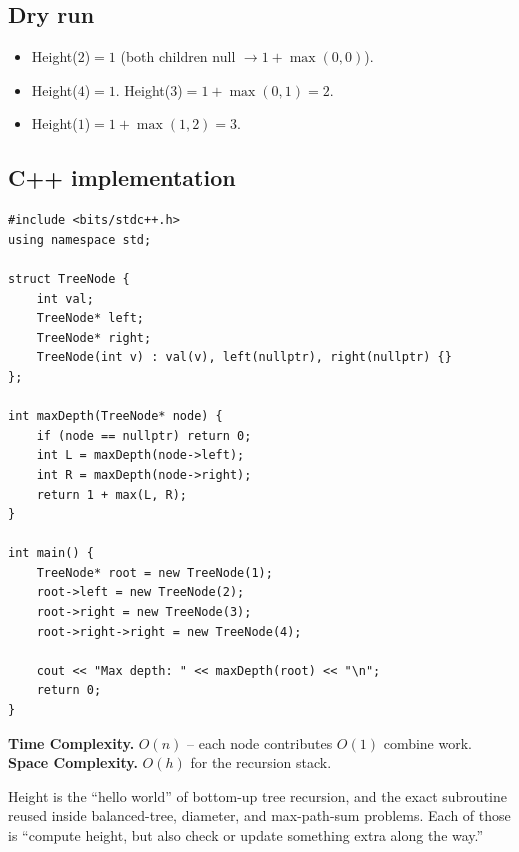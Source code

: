 \subsection*{Dry run}


\begin{itemize}
  \item Height($2$)$=1$ (both children null $\to 1+\max(0,0)$).
  \item Height($4$)$=1$. Height($3$)$=1+\max(0,1)=2$.
  \item Height($1$)$=1+\max(1,2)=3$.
\end{itemize}

\subsection*{C++ implementation}

\begin{lstlisting}
#include <bits/stdc++.h>
using namespace std;

struct TreeNode {
    int val;
    TreeNode* left;
    TreeNode* right;
    TreeNode(int v) : val(v), left(nullptr), right(nullptr) {}
};

int maxDepth(TreeNode* node) {
    if (node == nullptr) return 0;
    int L = maxDepth(node->left);
    int R = maxDepth(node->right);
    return 1 + max(L, R);
}

int main() {
    TreeNode* root = new TreeNode(1);
    root->left = new TreeNode(2);
    root->right = new TreeNode(3);
    root->right->right = new TreeNode(4);

    cout << "Max depth: " << maxDepth(root) << "\n";
    return 0;
}
\end{lstlisting}

\begin{complexitybox}
\textbf{Time Complexity.} $O(n)$ -- each node contributes $O(1)$ combine
work. \textbf{Space Complexity.} $O(h)$ for the recursion stack.
\end{complexitybox}

\begin{takeawaybox}
Height is the ``hello world'' of bottom-up tree recursion, and the exact
subroutine reused inside balanced-tree, diameter, and max-path-sum
problems. Each of those is ``compute height, but also check or update
something extra along the way.''
\end{takeawaybox}
